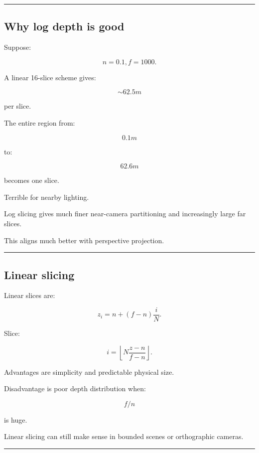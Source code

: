 \begin{center}\rule{0.5\linewidth}{0.5pt}\end{center}

\subsection{Why log depth is good}\label{04-visual-computing-ii-ch040-why-log-depth-is-good}

Suppose:

\[
n=0.1,
f=1000.
\]

A linear 16-slice scheme gives:

\[
\sim62.5m
\]

per slice.

The entire region from:

\[
0.1m
\]

to:

\[
62.6m
\]

becomes one slice.

Terrible for nearby lighting.

Log slicing gives much finer near-camera partitioning and increasingly large far slices.

This aligns much better with perspective projection.

\begin{center}\rule{0.5\linewidth}{0.5pt}\end{center}

\subsection{Linear slicing}\label{04-visual-computing-ii-ch040-linear-slicing}

Linear slices are:

\[
\boxed{
z_i=
n+
(f-n)\frac iN.
}
\]

Slice:

\[
\boxed{
i=
\left\lfloor
N
\frac{z-n}{f-n}
\right\rfloor.
}
\]

Advantages are simplicity and predictable physical size.

Disadvantage is poor depth distribution when:

\[
f/n
\]

is huge.

Linear slicing can still make sense in bounded scenes or orthographic cameras.

\begin{center}\rule{0.5\linewidth}{0.5pt}\end{center}

